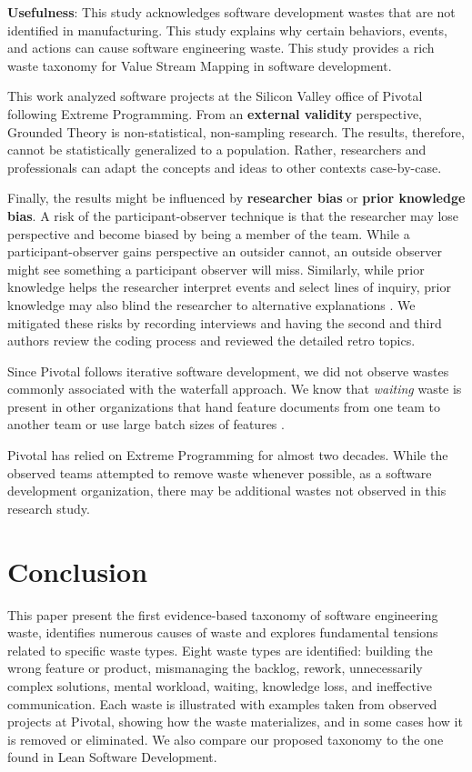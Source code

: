 \textbf{Usefulness}:  This study acknowledges software development wastes that are not identified in manufacturing. This study explains why certain behaviors, events, and actions can cause software engineering waste. This study provides a rich waste taxonomy for Value Stream Mapping in software development. 

This work analyzed software projects at the Silicon Valley office of Pivotal following Extreme Programming. From an \textbf{external validity} perspective, Grounded Theory is non-statistical, non-sampling research. The results, therefore, cannot be statistically generalized to a population. Rather, researchers and professionals can adapt the concepts and ideas to other contexts case-by-case.

Finally, the results might be influenced by \textbf{researcher bias} or \textbf{prior knowledge bias}. A risk of the participant-observer technique is that the researcher may lose perspective and become biased by being a member of the team. While a participant-observer gains perspective an outsider cannot, an outside observer might see something a participant observer will miss. Similarly, while prior knowledge helps the researcher interpret events and select lines of inquiry, prior knowledge may also blind the researcher to alternative explanations \cite{GlaserIssues}. We mitigated these risks by recording interviews and having the second and third authors review the coding process and reviewed the detailed retro topics.

Since Pivotal follows iterative software development, we did not observe wastes commonly associated with the waterfall approach. We know that \textit{waiting} waste is present in other organizations that hand feature documents from one team to another team or use large batch sizes of features \cite{Ali2016, Khurum2014, Mujtaba2010}.

Pivotal has relied on Extreme Programming for almost two decades. While the observed teams  attempted to remove waste whenever possible, as a  software development organization, there may be additional wastes not observed in this research study. 
\section{Conclusion}
\label{Conclusion}
This paper present the first evidence-based taxonomy of software engineering waste, identifies numerous causes of waste and explores fundamental tensions related to specific waste types. Eight waste types are identified: building the wrong feature or product, mismanaging the backlog, rework, unnecessarily complex solutions, mental workload, waiting, knowledge loss, and ineffective communication. Each waste is illustrated with examples taken from observed projects at Pivotal, showing how the waste materializes, and in some cases how it is removed or eliminated. We also compare our proposed taxonomy to the one found in Lean Software Development.

